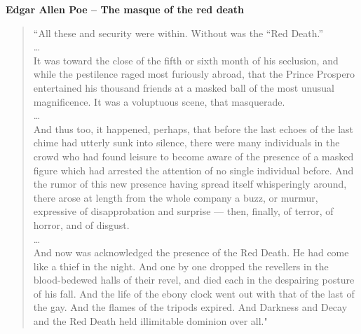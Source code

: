 \noindent
\textbf{Edgar Allen Poe -- The masque of the red death}
\begin{center}
\begin{quotation}
\noindent
``All these and security were within. Without was the “Red Death.” \cite{poe2020masque}\\

\noindent
\hfill \dots \hfill\\

\noindent
It was toward the close of the fifth or sixth month of his seclusion, and while the pestilence raged
most furiously abroad, that the Prince Prospero entertained his thousand friends at a masked ball of the
most unusual magnificence.
It was a voluptuous scene, that masquerade.\\

\noindent
\hfill \dots \hfill  \\

\noindent
And thus too, it happened, perhaps, that before
the last echoes of the last chime had utterly sunk into silence, there were many individuals in the crowd
who had found leisure to become aware of the presence of a masked figure which had arrested the
attention of no single individual before. And the rumor of this new presence having spread itself
whisperingly around, there arose at length from the whole company a buzz, or murmur, expressive of
disapprobation and surprise — then, finally, of terror, of horror, and of disgust.\\

\noindent
\hfill \dots \hfill \\

\noindent
And now was acknowledged the presence of the Red Death. He had come like a thief in the night.
And one by one dropped the revellers in the blood-bedewed halls of their revel, and died each in the
despairing posture of his fall. And the life of the ebony clock went out with that of the last of the gay.
And the flames of the tripods expired. And Darkness and Decay and the Red Death held illimitable
dominion over all."
\end{quotation}
\end{center}


